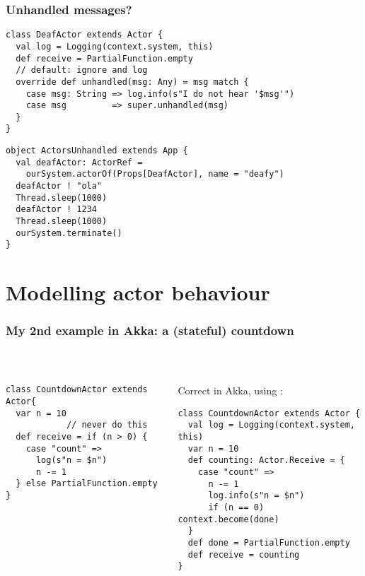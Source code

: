 \documentclass[aspectratio=169]{beamer}
\begin{document}
\begin{frame}[fragile]\frametitle{Unhandled messages?}

\begin{lstlisting}[emph={Actor, Logging, Props, ourSystem,terminate,sleep,actorOf,receive,unhandled}]
class DeafActor extends Actor {
  val log = Logging(context.system, this)
  def receive = PartialFunction.empty
  // default: ignore and log
  override def unhandled(msg: Any) = msg match {
    case msg: String => log.info(s"I do not hear '$msg'")
    case msg         => super.unhandled(msg)
  }
}
\end{lstlisting}
    
\begin{lstlisting}[emph={Actor, Logging, Props, ourSystem,terminate,sleep,actorOf}]
object ActorsUnhandled extends App {
  val deafActor: ActorRef =
    ourSystem.actorOf(Props[DeafActor], name = "deafy")
  deafActor ! "ola"
  Thread.sleep(1000)
  deafActor ! 1234
  Thread.sleep(1000)
  ourSystem.terminate()
}
\end{lstlisting}
\end{frame}


\section{Modelling actor behaviour}

\begin{frame}[fragile]\frametitle{My 2nd example in Akka: a (stateful) countdown}
~\\[-6mm]
\begin{columns}
\begin{column}{0.48\textwidth}
\begin{lstlisting}[emph={Actor, Logging, Props, ourSystem,terminate,sleep,actorOf,receive}]
class CountdownActor extends Actor{
  var n = 10
            // never do this
  def receive = if (n > 0) {
    case "count" =>
      log(s"n = $n")
      n -= 1
  } else PartialFunction.empty
}
\end{lstlisting}
\end{column}
\begin{column}{0.52\textwidth}
\pause
\alert{Correct in Akka, using :}
\begin{lstlisting}[emph={Actor, Logging, Props, ourSystem,terminate,sleep,actorOf,receive,become}]
class CountdownActor extends Actor {
  val log = Logging(context.system, this)
  var n = 10
  def counting: Actor.Receive = {
    case "count" =>
      n -= 1
      log.info(s"n = $n")
      if (n == 0) context.become(done)
  }
  def done = PartialFunction.empty
  def receive = counting
}
\end{lstlisting}
\end{column}
\end{columns}
\end{frame}
\end{document}
